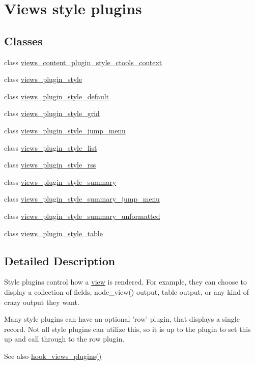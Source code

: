 \hypertarget{group__views__style__plugins}{
\section{Views style plugins}
\label{group__views__style__plugins}
}
\subsection*{Classes}
\begin{DoxyCompactItemize}
\item 
class \hyperlink{classviews__content__plugin__style__ctools__context}{views\_\-content\_\-plugin\_\-style\_\-ctools\_\-context}
\item 
class \hyperlink{classviews__plugin__style}{views\_\-plugin\_\-style}
\item 
class \hyperlink{classviews__plugin__style__default}{views\_\-plugin\_\-style\_\-default}
\item 
class \hyperlink{classviews__plugin__style__grid}{views\_\-plugin\_\-style\_\-grid}
\item 
class \hyperlink{classviews__plugin__style__jump__menu}{views\_\-plugin\_\-style\_\-jump\_\-menu}
\item 
class \hyperlink{classviews__plugin__style__list}{views\_\-plugin\_\-style\_\-list}
\item 
class \hyperlink{classviews__plugin__style__rss}{views\_\-plugin\_\-style\_\-rss}
\item 
class \hyperlink{classviews__plugin__style__summary}{views\_\-plugin\_\-style\_\-summary}
\item 
class \hyperlink{classviews__plugin__style__summary__jump__menu}{views\_\-plugin\_\-style\_\-summary\_\-jump\_\-menu}
\item 
class \hyperlink{classviews__plugin__style__summary__unformatted}{views\_\-plugin\_\-style\_\-summary\_\-unformatted}
\item 
class \hyperlink{classviews__plugin__style__table}{views\_\-plugin\_\-style\_\-table}
\end{DoxyCompactItemize}


\subsection{Detailed Description}
Style plugins control how a \hyperlink{classview}{view} is rendered. For example, they can choose to display a collection of fields, node\_\-view() output, table output, or any kind of crazy output they want.

Many style plugins can have an optional 'row' plugin, that displays a single record. Not all style plugins can utilize this, so it is up to the plugin to set this up and call through to the row plugin.

\begin{DoxySeeAlso}{See also}
\hyperlink{group__views__hooks_ga23f6e9972b2ed84fc54b7ff63f44477d}{hook\_\-views\_\-plugins()} 
\end{DoxySeeAlso}
